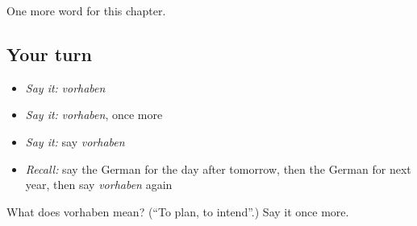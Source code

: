 \begin{grammarlens}[title={What you've built}]
One more word for this chapter.
\end{grammarlens}

\subsection*{Your turn}
\begin{itemize}
\raggedright
  \item \emph{Say it:} \emph{vorhaben}
  \item \emph{Say it:} \emph{vorhaben}, once more
  \item \emph{Say it:} say \emph{vorhaben}
  \item \emph{Recall:} say the German for the day after tomorrow, then the German for next year, then say \emph{vorhaben} again
\end{itemize}

\begin{tcolorbox}[breakable,colback=teal!4,colframe=teal!35!black,title={Before you move on}]
What does vorhaben mean? (\textquotedblleft{}To plan, to intend\textquotedblright{}.) Say it once more.
\end{tcolorbox}
